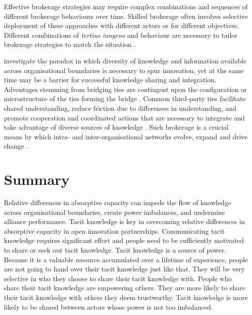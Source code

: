 Effective brokerage strategies may require complex combinations and sequences of different brokerage behaviours over time. Skilled brokerage often involves selective deployment of these approaches with different actors or for different objectives. Different combinations of \emph{tertius iungens} and  behaviour are necessary to tailor brokerage strategies to match the situation \citep{obstfeld2014brokerage}. 

\citet{tortoriello2010activating} investigate the paradox in which diversity of knowledge and information available across organisational boundaries is necessary to spur innovation, yet at the same time may be a barrier for successful knowledge sharing and integration. Advantages stemming from bridging ties are contingent upon the configuration or microstructure of the ties forming the bridge \citep{tortoriello2010activating,tortoriello2015social}. Common third-party ties facilitate shared understanding, reduce friction due to differences in understanding, and promote cooperation and coordinated actions that are necessary to integrate and take advantage of diverse sources of knowledge \citep{tortoriello2010activating}. Such brokerage is a crucial means by which intra- and inter-organisational networks evolve, expand and drive change \citep{obstfeld2014brokerage}.  \medskip

\section{Summary}

Relative differences in absorptive capacity can impede the flow of knowledge across organisational boundaries, create power imbalances, and undermine alliance performance. Tacit knowledge is key in overcoming relative differences in absorptive capacity in open innovation partnerships. Communicating tacit knowledge requires significant effort and people need to be sufficiently motivated to share or seek out tacit knowledge. Tacit knowledge is a source of power. Because it is a valuable resource accumulated over a lifetime of experience, people are not going to hand over their tacit knowledge just like that. They will be very selective in who they choose to share their tacit knowledge with. People who share their tacit knowledge are empowering others. They are more likely to share their tacit knowledge with others they deem trustworthy. Tacit knowledge is more likely to be shared between actors whose power is not too imbalanced.


